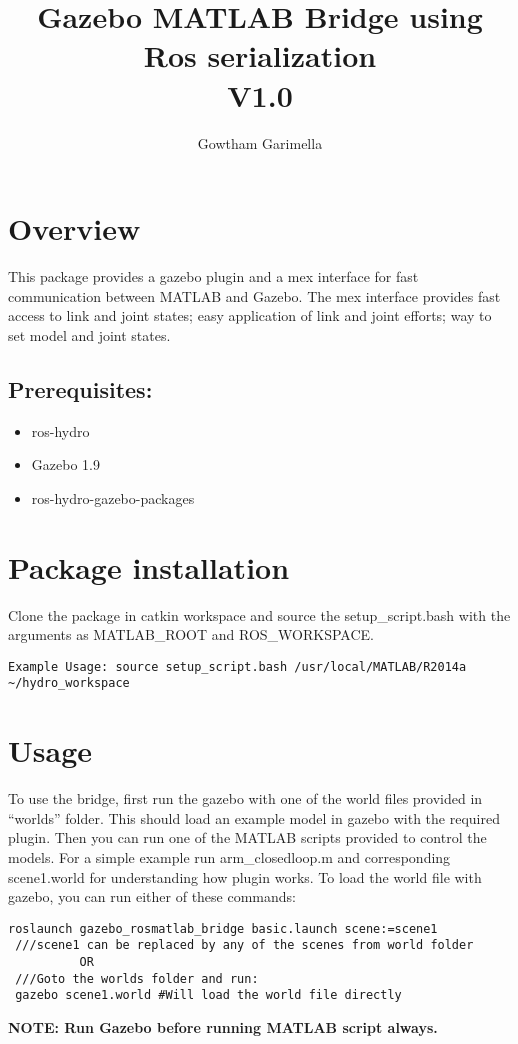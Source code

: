 \documentclass[letterpaper,10pt]{article}
\title{Gazebo MATLAB Bridge using Ros serialization \\V1.0} \label{gazebo-matlab-bridge-using-ros-serialization}
\author{Gowtham Garimella}
\begin{document}
\maketitle

\section{Overview}
This package provides a gazebo plugin and a mex interface for fast
communication between MATLAB and Gazebo. The mex interface provides fast
access to link and joint states; easy application of link and joint
efforts; way to set model and joint states. 
\subsection{Prerequisites:}
\begin{itemize}
 \item  ros-hydro 
 \item Gazebo 1.9
 \item ros-hydro-gazebo-packages
\end{itemize}

\section{Package installation}
Clone the package in catkin workspace and source the
setup\_script.bash with the arguments as MATLAB\_ROOT and
ROS\_WORKSPACE.
\begin{Verbatim}[frame=single]
Example Usage: source setup_script.bash /usr/local/MATLAB/R2014a ~/hydro_workspace
\end{Verbatim}
\section{Usage} 
To use the bridge, first run the gazebo with one of the world files provided in ``worlds''
folder. This should load an example model in gazebo with the required
plugin. Then you can run one of the MATLAB scripts provided to control
the models. For a simple example run arm\_closedloop.m and corresponding scene1.world for understanding how plugin works. To load the
world file with gazebo, you can run either of these commands: 
\begin{Verbatim}[frame=single]
 roslaunch gazebo_rosmatlab_bridge basic.launch scene:=scene1 
 ///scene1 can be replaced by any of the scenes from world folder
		  OR
 ///Goto the worlds folder and run:
 gazebo scene1.world #Will load the world file directly
\end{Verbatim}
\textbf{NOTE: Run Gazebo before running MATLAB script always.}
\end{document}
